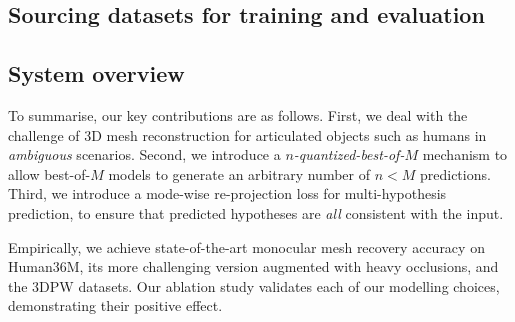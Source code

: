 \subsection{Sourcing datasets for training and evaluation}

\subsection{System overview}
To summarise, our key contributions are as follows.
First, we deal with the challenge of 3D mesh reconstruction for articulated objects such as humans in \emph{ambiguous} scenarios.
Second, we introduce a \emph{$n$-quantized-best-of-$M$} mechanism to allow best-of-$M$ models to generate an arbitrary number of $n<M$ predictions.
Third, we introduce a mode-wise re-projection loss for multi-hypothesis prediction, to ensure that predicted hypotheses are \emph{all} consistent with the input.

Empirically, we achieve state-of-the-art monocular mesh recovery accuracy on Human36M, its more challenging version augmented with heavy occlusions, and the 3DPW datasets.
Our ablation study validates each of our modelling choices, demonstrating their positive effect.

